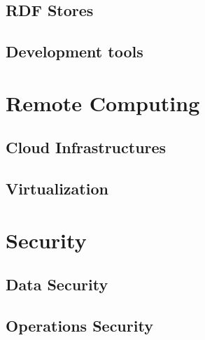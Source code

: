\subsection{RDF Stores}
\label{sec:ch2:semantic-web:rdf-stores}

\subsection{Development tools}
\label{sec:ch2:semantic-web:development-tools}


\section{Remote Computing}
\label{sec:ch2:remote-computing}


\subsection{Cloud Infrastructures}
\label{sec:ch2:security:cloud}

\subsection{Virtualization}
\label{sec:ch2:security:virtualization}

\section{Security}
\label{sec:ch2:security}

\subsection{Data Security}
\label{sec:ch2:security:data}


\subsection{Operations Security}
\label{sec:ch2:security:operations}


